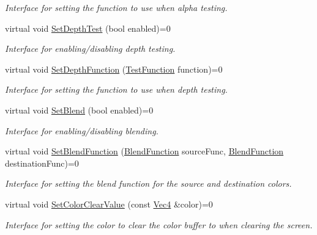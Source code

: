 \begin{DoxyCompactItemize}
\begin{DoxyCompactList}\small\item\em Interface for setting the function to use when alpha testing. \end{DoxyCompactList}\item 
virtual void \hyperlink{class_g_f_w_1_1_i_context_state_functions_af89da61bb0d9cd9d224cc78e3d22c9b7}{Set\+Depth\+Test} (bool enabled)=0
\begin{DoxyCompactList}\small\item\em Interface for enabling/disabling depth testing. \end{DoxyCompactList}\item 
virtual void \hyperlink{class_g_f_w_1_1_i_context_state_functions_a678a64426fe120cb1ec93de04b760683}{Set\+Depth\+Function} (\hyperlink{namespace_g_f_w_a2eabb5a646179bceaab2d5e3bfce2316}{Test\+Function} function)=0
\begin{DoxyCompactList}\small\item\em Interface for setting the function to use when depth testing. \end{DoxyCompactList}\item 
virtual void \hyperlink{class_g_f_w_1_1_i_context_state_functions_a801cddb223ed75c8a6a8453d35780e2e}{Set\+Blend} (bool enabled)=0
\begin{DoxyCompactList}\small\item\em Interface for enabling/disabling blending. \end{DoxyCompactList}\item 
virtual void \hyperlink{class_g_f_w_1_1_i_context_state_functions_aa551a7b37b0a3cfc743f045ce68e7825}{Set\+Blend\+Function} (\hyperlink{namespace_g_f_w_ac19434e926d01e02140f07e74ff36f3c}{Blend\+Function} source\+Func, \hyperlink{namespace_g_f_w_ac19434e926d01e02140f07e74ff36f3c}{Blend\+Function} destination\+Func)=0
\begin{DoxyCompactList}\small\item\em Interface for setting the blend function for the source and destination colors. \end{DoxyCompactList}\item 
virtual void \hyperlink{class_g_f_w_1_1_i_context_state_functions_aa18c9eb29a5e2c85440e28e72db56b05}{Set\+Color\+Clear\+Value} (const \hyperlink{namespace_g_f_w_1_1_math_a22b76a9624ba36b0f4eaa46d2e6b1fae}{Vec4} \&color)=0
\begin{DoxyCompactList}\small\item\em Interface for setting the color to clear the color buffer to when clearing the screen. \end{DoxyCompactList}\item 

\end{DoxyCompactItemize}
